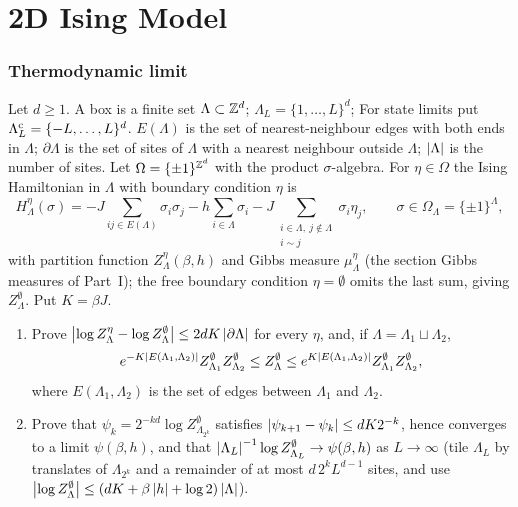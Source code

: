 \part{2D Ising Model}

\section{Thermodynamic limit}

\begin{exercise}
Let $d\ge1$.  A box is a finite set $\Lambda\subset\mathbb Z^d$; $\Lambda_L=\{1,\dots,L\}^d$;
For state limits put $\Lambda_L^{\rm c}=\{-L,\dots,L\}^d$. $E(\Lambda)$ is the set of nearest-neighbour edges with both ends in
$\Lambda$; $\partial\Lambda$ is the set of sites of $\Lambda$ with a
nearest neighbour outside $\Lambda$; $\left\lvert \Lambda\right\rvert$ is the number of sites.
Let $\Omega=\{\pm1\}^{\mathbb Z^d}$ with the product $\sigma$-algebra.  For
$\eta\in\Omega$ the Ising Hamiltonian in $\Lambda$ with boundary condition
$\eta$ is
\[
 H^\eta_\Lambda(\sigma)=-J\sum_{ij\in E(\Lambda)}\sigma_i\sigma_j-h\sum_{i\in\Lambda}\sigma_i
 -J\sum_{\substack{i\in\Lambda,\ j\notin\Lambda\\ i\sim j}}\sigma_i\eta_j,
 \qquad\sigma\in\Omega_\Lambda=\{\pm1\}^\Lambda,
\]
with partition function $Z^\eta_\Lambda(\beta,h)$ and Gibbs measure
$\mu^\eta_\Lambda$ (the section Gibbs measures of Part~I); the free
boundary condition $\eta=\emptyset$ omits the last sum, giving
$Z^\emptyset_\Lambda$.  Put $K=\beta J$.
\begin{enumerate}[label=(\alph*)]
\item Prove $\left\lvert \log Z^\eta_\Lambda-\log Z^\emptyset_\Lambda\right\rvert\le 2dK\left\lvert \partial\Lambda\right\rvert$
for every $\eta$, and, if $\Lambda=\Lambda_1\sqcup\Lambda_2$,
\[
 e^{-K\left\lvert E(\Lambda_1,\Lambda_2)\right\rvert}Z^\emptyset_{\Lambda_1}Z^\emptyset_{\Lambda_2}
 \le Z^\emptyset_\Lambda\le
 e^{K\left\lvert E(\Lambda_1,\Lambda_2)\right\rvert}Z^\emptyset_{\Lambda_1}Z^\emptyset_{\Lambda_2},
\]
where $E(\Lambda_1,\Lambda_2)$ is the set of edges between $\Lambda_1$ and $\Lambda_2$.
\item Prove that $\psi_k=2^{-kd}\log Z^\emptyset_{\Lambda_{2^k}}$ satisfies
$\left\lvert \psi_{k+1}-\psi_k\right\rvert\le dK2^{-k}$, hence converges to a limit
$\psi(\beta,h)$, and that
$\left\lvert \Lambda_L\right\rvert^{-1}\log Z^\emptyset_{\Lambda_L}\to\psi(\beta,h)$ as $L\to\infty$
(tile $\Lambda_L$ by translates of $\Lambda_{2^k}$ and a remainder of at most
$d\,2^kL^{d-1}$ sites, and use $\left\lvert \log Z^\emptyset_\Lambda\right\rvert\le(dK+\beta\left\lvert h\right\rvert+\log2)\left\lvert \Lambda\right\rvert$).

\end{enumerate}
\end{exercise}
